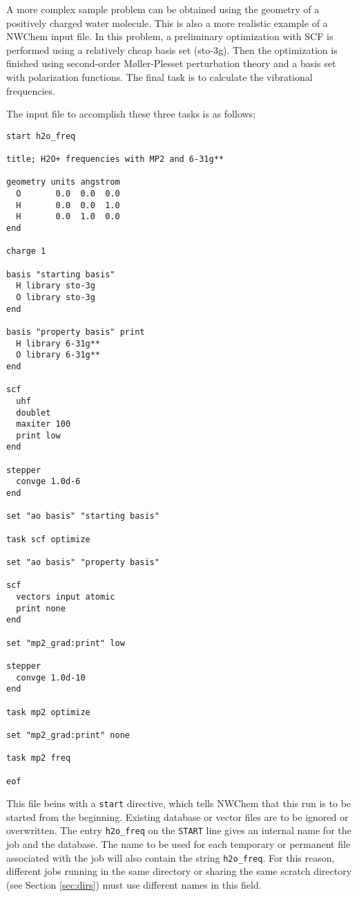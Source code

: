 A more complex sample problem can be obtained using the geometry of
a positively charged water molecule.  This is also a more realistic example
of a NWChem input file.  In this problem, a preliminary optimization
with SCF is performed using a relatively cheap basis set (sto-3g).  Then 
the optimization is finished using second-order M{\o}ller-Plesset 
perturbation theory and a basis set with polarization functions. 
The final task is to calculate the vibrational frequencies.

The input file to accomplish these three tasks is as follows;

\begin{verbatim}
start h2o_freq

title; H2O+ frequencies with MP2 and 6-31g**

geometry units angstrom
  O       0.0  0.0  0.0
  H       0.0  0.0  1.0
  H       0.0  1.0  0.0
end

charge 1

basis "starting basis"
  H library sto-3g
  O library sto-3g
end

basis "property basis" print
  H library 6-31g**
  O library 6-31g**
end

scf
  uhf
  doublet
  maxiter 100
  print low
end

stepper
  convge 1.0d-6
end

set "ao basis" "starting basis"

task scf optimize

set "ao basis" "property basis"

scf
  vectors input atomic
  print none
end

set "mp2_grad:print" low

stepper
  convge 1.0d-10
end

task mp2 optimize

set "mp2_grad:print" none

task mp2 freq

eof
\end{verbatim}

This file beins with a {\tt start} directive, which tells NWChem that this 
run is to be started from the beginning. Existing database or vector files 
are to be ignored or overwritten. The entry \verb+h2o_freq+ on the 
\verb+START+ line gives an internal name for the job and the database.  
The name to be used for each temporary or permanent file associated with the
job will also contain the string \verb+h2o_freq+. 
For this reason,
different jobs running in the same directory or sharing the same
scratch directory (see Section \ref{sec:dirs})
must use different names in this field.

